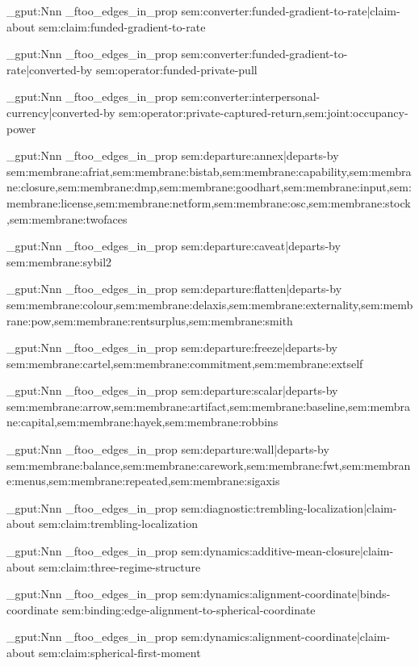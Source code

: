 \prop_gput:Nnn \g_ftoo_edges_in_prop { sem:converter:funded-gradient-to-rate|claim-about } { sem:claim:funded-gradient-to-rate }

\prop_gput:Nnn \g_ftoo_edges_in_prop { sem:converter:funded-gradient-to-rate|converted-by } { sem:operator:funded-private-pull }

\prop_gput:Nnn \g_ftoo_edges_in_prop { sem:converter:interpersonal-currency|converted-by } { sem:operator:private-captured-return,sem:joint:occupancy-power }

\prop_gput:Nnn \g_ftoo_edges_in_prop { sem:departure:annex|departs-by } { sem:membrane:afriat,sem:membrane:bistab,sem:membrane:capability,sem:membrane:closure,sem:membrane:dmp,sem:membrane:goodhart,sem:membrane:input,sem:membrane:license,sem:membrane:netform,sem:membrane:osc,sem:membrane:stock,sem:membrane:twofaces }

\prop_gput:Nnn \g_ftoo_edges_in_prop { sem:departure:caveat|departs-by } { sem:membrane:sybil2 }

\prop_gput:Nnn \g_ftoo_edges_in_prop { sem:departure:flatten|departs-by } { sem:membrane:colour,sem:membrane:delaxis,sem:membrane:externality,sem:membrane:pow,sem:membrane:rentsurplus,sem:membrane:smith }

\prop_gput:Nnn \g_ftoo_edges_in_prop { sem:departure:freeze|departs-by } { sem:membrane:cartel,sem:membrane:commitment,sem:membrane:extself }

\prop_gput:Nnn \g_ftoo_edges_in_prop { sem:departure:scalar|departs-by } { sem:membrane:arrow,sem:membrane:artifact,sem:membrane:baseline,sem:membrane:capital,sem:membrane:hayek,sem:membrane:robbins }

\prop_gput:Nnn \g_ftoo_edges_in_prop { sem:departure:wall|departs-by } { sem:membrane:balance,sem:membrane:carework,sem:membrane:fwt,sem:membrane:menus,sem:membrane:repeated,sem:membrane:sigaxis }

\prop_gput:Nnn \g_ftoo_edges_in_prop { sem:diagnostic:trembling-localization|claim-about } { sem:claim:trembling-localization }

\prop_gput:Nnn \g_ftoo_edges_in_prop { sem:dynamics:additive-mean-closure|claim-about } { sem:claim:three-regime-structure }

\prop_gput:Nnn \g_ftoo_edges_in_prop { sem:dynamics:alignment-coordinate|binds-coordinate } { sem:binding:edge-alignment-to-spherical-coordinate }

\prop_gput:Nnn \g_ftoo_edges_in_prop { sem:dynamics:alignment-coordinate|claim-about } { sem:claim:spherical-first-moment }

